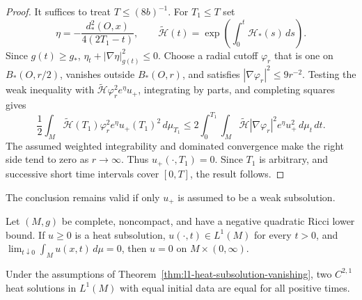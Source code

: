 \begin{proof}
It suffices to treat $T\leq(8b)^{-1}$.  For $T_1\leq T$ set
\[
\eta=-\frac{d_*^2(O,x)}{4(2T_1-t)},\qquad
\widetilde{\mathcal H}(t)=
\exp\!\left(\int_0^t\mathcal H_*(s)\,ds\right).
\]
Since $g(t)\geq g_*$,
$\eta_t+|\nabla\eta|_{g(t)}^2\leq0$.  Choose a radial cutoff $\varphi_r$ that
is one on $B_*(O,r/2)$, vanishes outside $B_*(O,r)$, and satisfies
$|\nabla\varphi_r|^2\leq9r^{-2}$.  Testing the weak inequality with
$\widetilde{\mathcal H}\varphi_r^2e^\eta u_+$, integrating by parts, and
completing squares gives
\[
\frac12\int_M\widetilde{\mathcal H}(T_1)\varphi_r^2e^\eta
u_+(T_1)^2\,d\mu_{T_1}
\leq2\int_0^{T_1}\!\int_M
\widetilde{\mathcal H}|\nabla\varphi_r|^2e^\eta u_+^2\,d\mu_t\,dt.
\]
The assumed weighted integrability and dominated convergence make the right
side tend to zero as $r\to\infty$.  Thus $u_+(\cdot,T_1)=0$.  Since $T_1$ is
arbitrary, and successive short time intervals cover $[0,T]$, the result
follows.
\end{proof}

\begin{remark}
\label{rem:evolving-wmp-positive-part}
The conclusion remains valid if only $u_+$ is assumed to be a weak
subsolution.
\end{remark}

\begin{theorem}[$L^1$ vanishing]
\label{thm:l1-heat-subsolution-vanishing}
Let $(M,g)$ be complete, noncompact, and have a negative quadratic Ricci lower
bound.  If $u\geq0$ is a heat subsolution,
$u(\cdot,t)\in L^1(M)$ for every $t>0$, and
$\lim_{t\downarrow0}\int_Mu(x,t)\,d\mu=0$, then $u=0$ on
$M\times(0,\infty)$.
\end{theorem}

\begin{corollary}[$L^1$ uniqueness]
\label{cor:l1-heat-uniqueness}
Under the assumptions of Theorem~\ref{thm:l1-heat-subsolution-vanishing}, two
$C^{2,1}$ heat solutions in $L^1(M)$ with equal initial data are equal for all
positive times.
\end{corollary}

